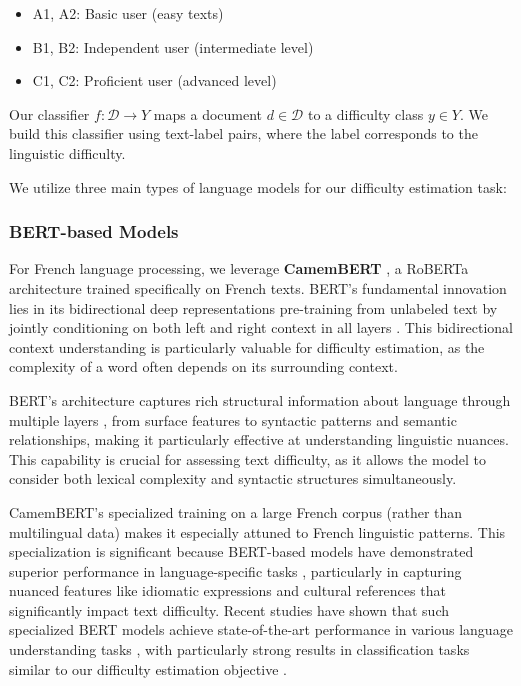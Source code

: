 \begin{itemize}
    \item A1, A2: Basic user (easy texts)
    \item B1, B2: Independent user (intermediate level)
    \item C1, C2: Proficient user (advanced level)
\end{itemize}

Our classifier $f: \mathcal{D} \rightarrow Y$ maps a document \(d \in \mathcal{D}\) to a difficulty class \(y \in Y\). We build this classifier using text-label pairs, where the label corresponds to the linguistic difficulty.

We utilize three main types of language models for our difficulty estimation task:

\subsubsection{BERT-based Models}
For French language processing, we leverage \textbf{CamemBERT} \cite{martin-etal-2020-camembert}, a RoBERTa architecture trained specifically on French texts. BERT's fundamental innovation lies in its bidirectional deep representations pre-training from unlabeled text by jointly conditioning on both left and right context in all layers \cite{Devlin2019BERT}. This bidirectional context understanding is particularly valuable for difficulty estimation, as the complexity of a word often depends on its surrounding context.

BERT's architecture captures rich structural information about language through multiple layers \cite{Jawahar2019What}, from surface features to syntactic patterns and semantic relationships, making it particularly effective at understanding linguistic nuances. This capability is crucial for assessing text difficulty, as it allows the model to consider both lexical complexity and syntactic structures simultaneously.

CamemBERT's specialized training on a large French corpus (rather than multilingual data) makes it especially attuned to French linguistic patterns. This specialization is significant because BERT-based models have demonstrated superior performance in language-specific tasks \cite{Gonzalez2020Comparing}, particularly in capturing nuanced features like idiomatic expressions and cultural references that significantly impact text difficulty. Recent studies have shown that such specialized BERT models achieve state-of-the-art performance in various language understanding tasks \cite{Gao2019Target}, with particularly strong results in classification tasks similar to our difficulty estimation objective \cite{Aftan2023Survey}.


